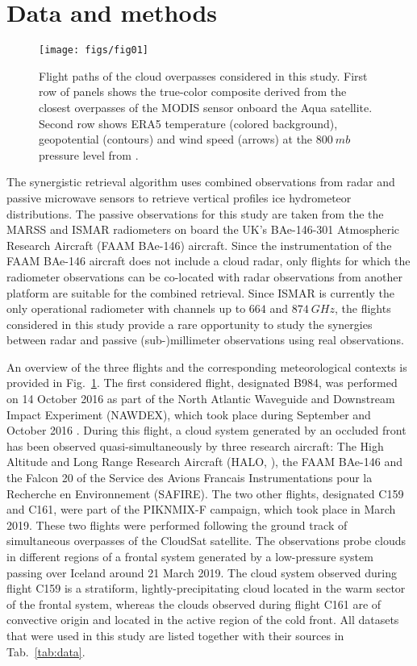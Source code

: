 \documentclass[journal abbreviation, manuscript]{copernicus}
\begin{document}
\section{Data and methods}
\label{sec:methods_and_data}

\begin{figure}[h!]
  \centering \texttt{[image: figs/fig01]}
  \caption{Flight paths of the cloud overpasses considered in this study. First
    row of panels shows the true-color composite derived from the closest
    overpasses of the MODIS \citep{modis} sensor onboard the Aqua satellite.
    Second row shows ERA5 temperature (colored background),
    geopotential (contours) and wind speed (arrows) at the $800\ \unit{mb}$
    pressure level from \citet{era5}.}
  \label{fig:flight_overview}
\end{figure}

The synergistic retrieval algorithm uses combined observations from radar and
passive microwave sensors to retrieve vertical profiles ice hydrometeor
distributions. The passive observations for this study are taken from the the
MARSS \citep{mcgrath01} and ISMAR \citep{fox17} radiometers on board the UK’s
BAe-146-301 Atmospheric Research Aircraft (FAAM BAe-146) aircraft. Since the
instrumentation of the FAAM BAe-146 aircraft does not include a cloud radar,
only flights for which the radiometer observations can be co-located with radar
observations from another platform are suitable for the combined retrieval.
Since ISMAR is currently the only operational radiometer with channels up to
$664$ and $874\ \unit{GHz}$, the flights considered in this study provide a rare
opportunity to study the synergies between radar and passive (sub-)millimeter
observations using real observations.

An overview of the three flights and the corresponding meteorological contexts
is provided in Fig.~\ref{fig:flight_overview}. The first considered flight,
designated B984, was performed on 14 October 2016 as part of the North Atlantic
Waveguide and Downstream Impact Experiment (NAWDEX), which took place during
September and October 2016 \citep{schafler18}. During this flight, a cloud
system generated by an occluded front has been observed quasi-simultaneously by
three research aircraft: The High Altitude and Long Range Research Aircraft
(HALO, \citet{krautstrunk12}), the FAAM BAe-146 and the Falcon 20 of the Service
des Avions Francais Instrumentations pour la Recherche en Environnement
(SAFIRE). The two other flights, designated C159 and C161, were part of the
PIKNMIX-F campaign, which took place in March 2019. These two flights were
performed following the ground track of simultaneous overpasses of the CloudSat
satellite. The observations probe clouds in different regions of a frontal
system generated by a low-pressure system passing over Iceland around 21 March
2019. The cloud system observed during flight C159 is a stratiform,
lightly-precipitating cloud located in the warm sector of the frontal system,
whereas the clouds observed during flight C161 are of convective origin and
located in the active region of the cold front. All datasets that were used in
this study are listed together with their sources in Tab.~\ref{tab:data}.
\end{document}
